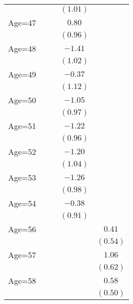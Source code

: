 \documentclass[fullpage]{paper}
\begin{document}
\begin{center}
\begin{longtable}{l c c c c }
            &              &               & $(1.01)$      &               \\
Age=47      &              &               & $0.80$        &               \\
            &              &               & $(0.96)$      &               \\
Age=48      &              &               & $-1.41$       &               \\
            &              &               & $(1.02)$      &               \\
Age=49      &              &               & $-0.37$       &               \\
            &              &               & $(1.12)$      &               \\
Age=50      &              &               & $-1.05$       &               \\
            &              &               & $(0.97)$      &               \\
Age=51      &              &               & $-1.22$       &               \\
            &              &               & $(0.96)$      &               \\
Age=52      &              &               & $-1.20$       &               \\
            &              &               & $(1.04)$      &               \\
Age=53      &              &               & $-1.26$       &               \\
            &              &               & $(0.98)$      &               \\
Age=54      &              &               & $-0.38$       &               \\
            &              &               & $(0.91)$      &               \\
Age=56      &              &               &               & $0.41$        \\
            &              &               &               & $(0.54)$      \\
Age=57      &              &               &               & $1.06$        \\
            &              &               &               & $(0.62)$      \\
Age=58      &              &               &               & $0.58$        \\
            &              &               &               & $(0.50)$      \\

\end{longtable}
\end{center}
\end{document}
